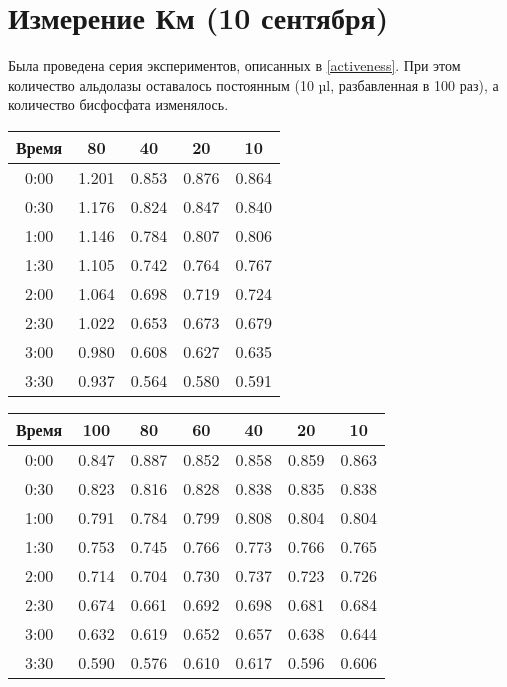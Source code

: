 \section{Измерение Км (10 сентября)}

Была проведена серия экспериментов, описанных в \ref{activeness}.
При этом количество альдолазы оставалось постоянным (10 µl, разбавленная в 100 раз),
а количество бисфосфата изменялось.

\begin{tabular}{|c|c|c|c|c|}
\hline
Время &  80  & 40    &  20   &  10   \\
\hline
0:00 & 1.201 & 0.853 & 0.876 & 0.864 \\
0:30 & 1.176 & 0.824 & 0.847 & 0.840 \\
1:00 & 1.146 & 0.784 & 0.807 & 0.806 \\
1:30 & 1.105 & 0.742 & 0.764 & 0.767 \\
2:00 & 1.064 & 0.698 & 0.719 & 0.724 \\
2:30 & 1.022 & 0.653 & 0.673 & 0.679 \\
3:00 & 0.980 & 0.608 & 0.627 & 0.635 \\
3:30 & 0.937 & 0.564 & 0.580 & 0.591 \\
\hline
\end{tabular}

\begin{tabular}{|c|c|c|c|c|c|c|}
\hline
Время &  100   &  80   &  60   &  40   &  20   &  10   \\
\hline
0:00  &  0.847 & 0.887 & 0.852 & 0.858 & 0.859 & 0.863 \\
0:30  &  0.823 & 0.816 & 0.828 & 0.838 & 0.835 & 0.838 \\
1:00  &  0.791 & 0.784 & 0.799 & 0.808 & 0.804 & 0.804 \\
1:30  &  0.753 & 0.745 & 0.766 & 0.773 & 0.766 & 0.765 \\
2:00  &  0.714 & 0.704 & 0.730 & 0.737 & 0.723 & 0.726 \\
2:30  &  0.674 & 0.661 & 0.692 & 0.698 & 0.681 & 0.684 \\
3:00  &  0.632 & 0.619 & 0.652 & 0.657 & 0.638 & 0.644 \\
3:30  &  0.590 & 0.576 & 0.610 & 0.617 & 0.596 & 0.606 \\
\hline
\end{tabular}


